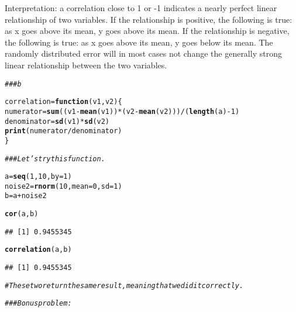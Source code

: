 \documentclass[12pt,letter]{article}\usepackage[]{graphicx}\usepackage[]{color}
\makeatletter
\newcommand{\hlnum}[1]{\textcolor[rgb]{0.686,0.059,0.569}{#1}}%
\newcommand{\hlcom}[1]{\textcolor[rgb]{0.678,0.584,0.686}{\textit{#1}}}%
\newcommand{\hlopt}[1]{\textcolor[rgb]{0,0,0}{#1}}%
\newcommand{\hlstd}[1]{\textcolor[rgb]{0.345,0.345,0.345}{#1}}%
\newcommand{\hlkwa}[1]{\textcolor[rgb]{0.161,0.373,0.58}{\textbf{#1}}}%
\newcommand{\hlkwb}[1]{\textcolor[rgb]{0.69,0.353,0.396}{#1}}%
\newcommand{\hlkwc}[1]{\textcolor[rgb]{0.333,0.667,0.333}{#1}}%
\newcommand{\hlkwd}[1]{\textcolor[rgb]{0.737,0.353,0.396}{\textbf{#1}}}%
\newenvironment{kframe}{%
 \def\at@end@of@kframe{}%
 \ifinner\ifhmode%
  \def\at@end@of@kframe{\end{minipage}}%
  \begin{minipage}{\columnwidth}%
 \fi\fi%
 \def\FrameCommand##1{\hskip\@totalleftmargin \hskip-\fboxsep
 \colorbox{shadecolor}{##1}\hskip-\fboxsep
     \hskip-\linewidth \hskip-\@totalleftmargin \hskip\columnwidth}%
 \MakeFramed {\advance\hsize-\width
   \@totalleftmargin\z@ \linewidth\hsize
   \@setminipage}}%
 {\par\unskip\endMakeFramed%
 \at@end@of@kframe}
\newenvironment{knitrout}{}{} %
\makeatother
\begin{document}
Interpretation: a correlation close to 1 or -1 indicates a nearly perfect linear relationship of two variables. If the relationship is positive, the following is true: as x goes above its mean, y goes above its mean. If the relationship is negative, the following is true: as x goes above its mean, y goes below its mean. The randomly distributed error will in most cases not change the generally strong linear relationship between the two variables.

\begin{knitrout}
\color{fgcolor}\begin{kframe}
\begin{alltt}
\hlcom{### b}

\hlstd{correlation} \hlkwb{=} \hlkwa{function}\hlstd{(}\hlkwc{v1}\hlstd{,} \hlkwc{v2}\hlstd{) \{}
    \hlstd{numerator} \hlkwb{=} \hlkwd{sum}\hlstd{((v1} \hlopt{-} \hlkwd{mean}\hlstd{(v1))} \hlopt{*} \hlstd{(v2} \hlopt{-} \hlkwd{mean}\hlstd{(v2)))}\hlopt{/}\hlstd{(}\hlkwd{length}\hlstd{(a)} \hlopt{-} \hlnum{1}\hlstd{)}
    \hlstd{denominator} \hlkwb{=} \hlkwd{sd}\hlstd{(v1)} \hlopt{*} \hlkwd{sd}\hlstd{(v2)}
    \hlkwd{print}\hlstd{(numerator}\hlopt{/}\hlstd{denominator)}
\hlstd{\}}

\hlcom{### Let's try this function.}

\hlstd{a} \hlkwb{=} \hlkwd{seq}\hlstd{(}\hlnum{1}\hlstd{,} \hlnum{10}\hlstd{,} \hlkwc{by} \hlstd{=} \hlnum{1}\hlstd{)}
\hlstd{noise2} \hlkwb{=} \hlkwd{rnorm}\hlstd{(}\hlnum{10}\hlstd{,} \hlkwc{mean} \hlstd{=} \hlnum{0}\hlstd{,} \hlkwc{sd} \hlstd{=} \hlnum{1}\hlstd{)}
\hlstd{b} \hlkwb{=} \hlstd{a} \hlopt{+} \hlstd{noise2}

\hlkwd{cor}\hlstd{(a, b)}
\end{alltt}
\begin{verbatim}
## [1] 0.9455345
\end{verbatim}
\begin{alltt}
\hlkwd{correlation}\hlstd{(a, b)}
\end{alltt}
\begin{verbatim}
## [1] 0.9455345
\end{verbatim}
\begin{alltt}
\hlcom{# These two return the same result, meaning that we did it correctly.}

\hlcom{### Bonus problem:}


\end{alltt}
\end{kframe}
\end{knitrout}
\end{document}
